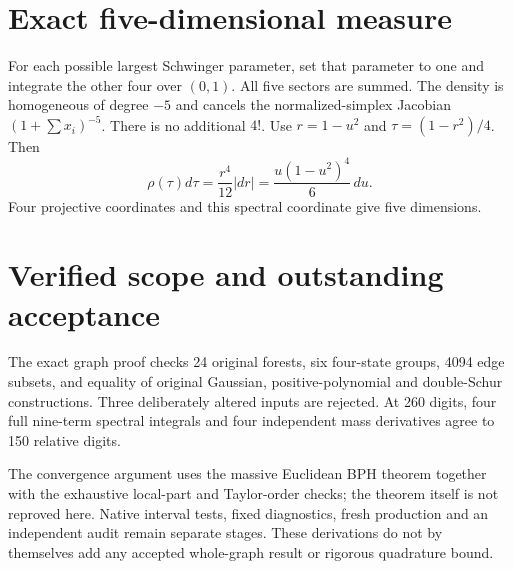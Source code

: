 \documentclass[11pt]{article}
\begin{document}
\section*{Exact five-dimensional measure}
For each possible largest Schwinger parameter, set that parameter to one and integrate the other four over $(0,1)$. All five sectors are summed. The density is homogeneous of degree $-5$ and cancels the normalized-simplex Jacobian $(1+\sum x_i)^{-5}$. There is no additional $4!$.
Use $r=1-u^2$ and $\tau=(1-r^2)/4$. Then
\[
 \rho(\tau)d\tau=\frac{r^4}{12}|dr|=
 \frac{u(1-u^2)^4}{6}\,du.
\]
Four projective coordinates and this spectral coordinate give five dimensions.
\section*{Verified scope and outstanding acceptance}
The exact graph proof checks 24 original forests, six four-state groups, 4094 edge subsets, and equality of original Gaussian, positive-polynomial and double-Schur constructions. Three deliberately altered inputs are rejected. At 260 digits, four full nine-term spectral integrals and four independent mass derivatives agree to 150 relative digits.

The convergence argument uses the massive Euclidean BPH theorem together with the exhaustive local-part and Taylor-order checks; the theorem itself is not reproved here. Native interval tests, fixed diagnostics, fresh production and an independent audit remain separate stages. These derivations do not by themselves add any accepted whole-graph result or rigorous quadrature bound.
\end{document}
